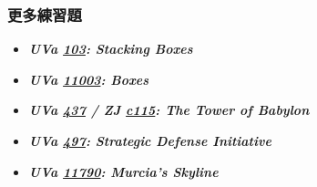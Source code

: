 \subsubsection*{更多練習題}
\begin{itemize}[label={\PencilLeftDown}]
\item \textbf{\textit{UVa \href{http://uva.onlinejudge.org/external/1/103.html}{103}: Stacking Boxes}}
\item \textbf{\textit{UVa \href{http://uva.onlinejudge.org/external/110/11003.html}{11003}: Boxes}}
\item \textbf{\textit{UVa \href{http://uva.onlinejudge.org/external/4/437.html}{437} / ZJ \href{http://zerojudge.tw/ShowProblem?problemid=c115}{c115}: The Tower of Babylon}}
\item \textbf{\textit{UVa \href{http://uva.onlinejudge.org/external/4/497.html}{497}: Strategic Defense Initiative}}
\item \textbf{\textit{UVa \href{http://uva.onlinejudge.org/external/117/11790.html}{11790}: Murcia's Skyline}}
\end{itemize}